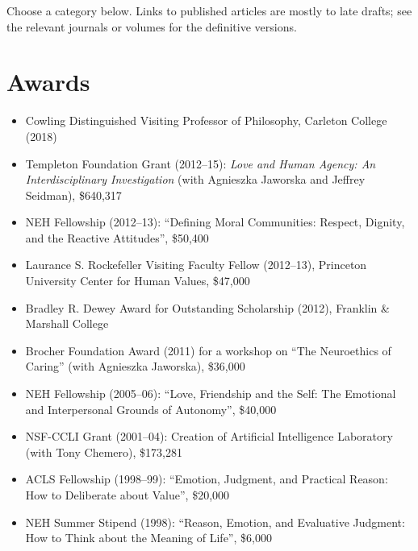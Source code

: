 \documentclass[%
  11pt,%
]{article}
\begin{document}
\newrefsection
\nocite{*}


Choose a category below. Links to published articles are mostly to late drafts; see the relevant journals or volumes for the definitive versions.

\printbibliography[filter=myarticle]





\section{Awards}

\begin{itemize}

  \item Cowling Distinguished Visiting Professor of Philosophy, Carleton College (2018)
  \item Templeton Foundation Grant (2012--15): \emph{Love and Human Agency: An Interdisciplinary Investigation} (with Agnieszka Jaworska and Jeffrey Seidman), \$640,317
  \item NEH Fellowship (2012--13): \enquote{Defining Moral Communities: Respect, Dignity, and the Reactive Attitudes}, \$50,400
  \item Laurance S. Rockefeller Visiting Faculty Fellow (2012--13), Princeton University Center for Human Values, \$47,000
  \item Bradley R. Dewey Award for Outstanding Scholarship (2012), Franklin \& Marshall College
  \item Brocher Foundation Award (2011) for a workshop on \enquote{The Neuroethics of Caring} (with Agnieszka Jaworska), \$36,000
  \item NEH Fellowship (2005--06): \enquote{Love, Friendship and the Self: The Emotional and Interpersonal Grounds of Autonomy}, \$40,000
  \item NSF-CCLI Grant (2001--04): Creation of Artificial Intelligence Laboratory (with Tony Chemero), \$173,281
  \item ACLS Fellowship (1998--99): \enquote{Emotion, Judgment, and Practical Reason: How to Deliberate about Value}, \$20,000
  \item NEH Summer Stipend (1998): \enquote{Reason, Emotion, and Evaluative Judgment: How to Think about the Meaning of Life}, \$6,000

\end{itemize}
\end{document}
